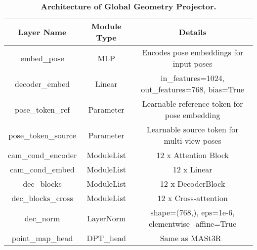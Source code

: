 \begin{table*}[h!]
\centering
\caption{\textbf{Architecture of Global Geometry Projector.} }
\renewcommand{\arraystretch}{0.8} %
\setlength{\tabcolsep}{8pt} %
\begin{tabular}{ccc}
\toprule
\textbf{Layer Name} & \textbf{Module Type} & \textbf{Details} \\ \midrule
embed\_pose & MLP & Encodes pose embeddings for input poses \\
decoder\_embed & Linear & in\_features=1024, out\_features=768, bias=True \\
pose\_token\_ref & Parameter & Learnable reference token for pose embedding \\
pose\_token\_source & Parameter & Learnable source token for multi-view poses \\
cam\_cond\_encoder & ModuleList & 12 x Attention Block\\
cam\_cond\_embed & ModuleList & 12 x Linear \\
dec\_blocks & ModuleList  & 12 x DecoderBlock  \\
dec\_blocks\_cross & ModuleList & 12 x Cross-attention\\
dec\_norm & LayerNorm & shape=(768,), eps=1e-6, elementwise\_affine=True \\
point\_map\_head & DPT\_head & Same as  MASt3R~\cite{leroy2024grounding} \\
\bottomrule
\end{tabular}
\label{tab:global_projector}
\end{table*}

